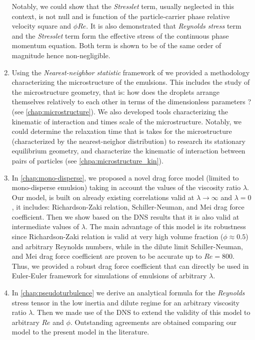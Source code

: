 \begin{enumerate}
    Notably, we could show that the \textit{Stresslet} term, usually neglected in this context, is not null and is function of the particle-carrier phase relative velocity square and $\phi Re$.  
    It is also demonstrated that \textit{Reynolds stress} term and the \textit{Stresslet} term form the effective stress of the continuous phase momentum equation. 
    Both term is shown to be of the same order of magnitude hence non-negligible. 
    \item Using the \textit{Nearest-neighbor statistic} framework of \citet{zhang2023evolution} we provided a methodology characterizing the microstructure of the emulsions. 
    This includes the study of the microstructure geometry, that is: how does the droplets arrange themselves relatively to each other in terms of the dimensionless parameters ? (see \ref{chap:microstructure}). 
    We also developed tools characterizing the kinematic of interaction and times scale of the microstructure. 
    Notably, we could determine the relaxation time that is takes for the microstructure (characterized by the nearest-neighor distribution) to research its stationary equilibrium geometry, and characterize the kinematic of interaction between pairs of particles (see \ref{chpa:microstructure_kin}). 
    \item In \ref{chap:mono-disperse}, we proposed a novel drag force model (limited to mono-disperse emulsion) taking in account the values of the viscosity ratio $\lambda$. 
    Our model, is built on already existing correlations valid at $\lambda\to\infty$ and $\lambda = 0$, it includes: Richardson-Zaki relation, Schiller-Neuman, and Mei drag force coefficient.
    Then we show based on the DNS results that it is also valid at intermediate values of $\lambda$.
    The main advantage of this model is its robustness since Richardson-Zaki relation is valid at very high volume fraction  ($\phi \approx 0.5$) and arbitrary Reynolds numbers, while in the dilute limit Schiller-Neuman, and Mei drag force coefficient are proven to be accurate up to $Re = 800$. 
    Thus, we provided a robust drag force coefficient that can directly be used in Euler-Euler framework for simulations of emulsions of arbitrary $\lambda$.   
    \item In \ref{chap:pseudoturbulence} we derive an analytical formula for the \textit{Reynolds} stress tensor in the low inertia and dilute regime for an arbitrary viscosity ratio $\lambda$. 
    Then we made use of the DNS to extend the validity of this model to arbitrary $Re$ and $\phi$. 
    Outstanding agreements are obtained comparing our model to the present model in the literature.  
\end{enumerate}

